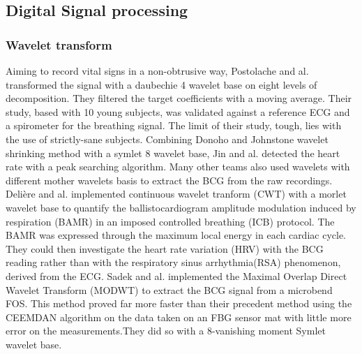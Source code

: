 \documentclass[twoside,twocolumn]{article}
\begin{document}
	\subsection{Digital Signal processing}
	\label{subsection:LR:DSP}
		\subsubsection{Wavelet transform}
		Aiming to record vital signs in a non-obtrusive way, Postolache and al. \cite{postolache_vital_2007} transformed the signal with a daubechie 4 wavelet base on eight levels of decomposition. They filtered the target coefficients with a moving average. Their study, based with 10 young subjects, was validated against a reference ECG and a spirometer for the breathing signal. The limit of their study, tough, lies with the use of strictly-sane subjects. 
		Combining Donoho and Johnstone \cite{donoho_adapting_1995} wavelet shrinking method with a symlet 8 wavelet base, Jin and al. \cite{jin_novel_2009} detected the heart rate with a peak searching algorithm. 
		Many other teams also used wavelets with different mother wavelets basis to extract the BCG from the raw recordings. Delière and al. \cite{deliere_ballistocardiogram_2015} implemented continuous wavelet tranform (CWT) with a morlet wavelet base to quantify the ballistocardiogram amplitude modulation induced by respiration (BAMR) in an imposed controlled breathing (ICB) protocol. The BAMR was expressed through the maximum local energy in each cardiac cycle. They could then investigate the heart rate variation (HRV) with the BCG reading rather than with the respiratory sinus arrhythmia(RSA) phenomenon, derived from the ECG. 
		Sadek and al. \cite{sadek_continuous_2017} implemented the Maximal Overlap Direct Wavelet Transform (MODWT) to extract the BCG signal from a microbend FOS. This method proved far more faster than their precedent method using the CEEMDAN algorithm on the data taken on an FBG sensor mat with little more error on the measurements.They did so with a 8-vanishing moment Symlet  wavelet base. 
		
\end{document}
